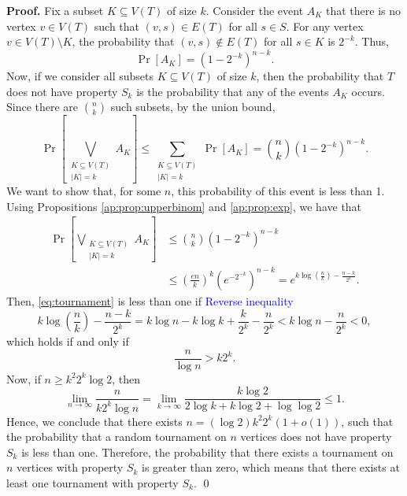 \textbf{Proof. } Fix a subset $K \subseteq V(T)$ of size $k$. Consider the event $A_K$ that there is no vertex $v \in V(T)$ such that $(v, s) \in E(T)$ for all $s \in S$. For any vertex $v \in V(T) \setminus K$, the probability that $(v, s) \notin E(T)$ for all $s \in K$ is $2^{-k}$. Thus,
\[\Pr[A_K] = \left(1 - 2^{-k}\right)^{n - k}.\]
Now, if we consider all subsets $K \subseteq V(T)$ of size $k$, then the probability that $T$ does not have property $S_k$ is the probability that any of the events $A_K$ occurs. Since there are $\binom{n}{k}$ such subsets, by the union bound,
\[\Pr\left[\bigvee_{\substack{K \subseteq V(T) \\ |K| = k}} A_K\right] \leq \sum_{\substack{K \subseteq V(T) \\ |K| = k}}\Pr[A_K] = \binom{n}{k}\left(1 - 2^{-k}\right)^{n - k}.\]
We want to show that, for some $n$, this probability of this event is less than 1. Using Propositions \ref{ap:prop:upperbinom} and \ref{ap:prop:exp}, we have that
\begin{align}
    \Pr\left[\bigvee_{\substack{K \subseteq V(T) \\ |K| = k}} A_K\right] &\leq \binom{n}{k}\left(1 - 2^{-k}\right)^{n - k} \\
    &\leq \left(\frac{en}{k}\right)^k\left(e^{-2^{-k}}\right)^{n - k} = e^{k\log\left(\frac{n}{k}\right) - \frac{n - k}{2^k}}. \label{eq:tournament}
\end{align}
Then, \ref{eq:tournament} is less than one if \textcolor{blue}{Reverse inequality}
\[k\log\left(\frac{n}{k}\right) - \frac{n - k}{2^k} = k\log n - k\log k + \frac{k}{2^k} - \frac{n}{2^k} < k\log n - \frac{n}{2^k} < 0,\]
which holds if and only if
\[\frac{n}{\log n} > k2^k.\]
Now, if $n \geq k^2 2^k\log 2$, then 
\[\lim_{n \to \infty} \frac{n}{k2^k\log n} = \lim_{k \to \infty} \frac{k\log 2}{2\log k + k\log 2 + \log\log 2} \leq 1.\]
Hence, we conclude that there exists $n = (\log 2)k^2 2^k (1 + o(1))$, such that the probability that a random tournament on $n$ vertices does not have property $S_k$ is less than one. Therefore, the probability that there exists a tournament on $n$ vertices with property $S_k$ is greater than zero, which means that there exists at least one tournament with property $S_k$. \qed

